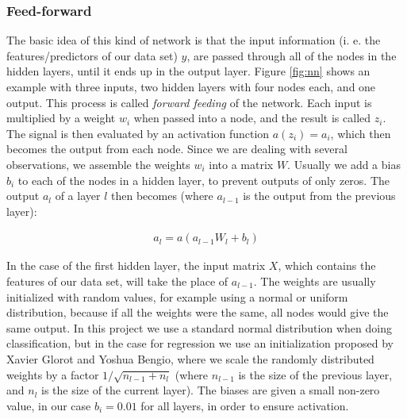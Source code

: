 \subsubsection{Feed-forward}\label{feed-forward}

The basic idea of this kind of network is that the input information (i.
e. the features/predictors of our data set) \(y\), are passed through
all of the nodes in the hidden layers, until it ends up in the output
layer. Figure \ref{fig:nn} shows an example with three inputs, two hidden
layers with four nodes each, and one output. This process is called
\emph{forward feeding} of the network. Each input is multiplied by a
weight \(w_i\) when passed into a node, and the result is called
\(z_i\). The signal is then evaluated by an activation function
\(a(z_i) = a_i\), which then becomes the output from each node. Since
we are dealing with several observations, we assemble the weights
\(w_i\) into a matrix \(W\). Usually we add a bias \(b_i\) to each of the
nodes in a hidden layer, to prevent outputs of only zeros. The output
\(a_l\) of a layer \(l\) then becomes (where \(a_{l-1}\) is the output
from the previous layer):

\begin{align}
a_l = a(a_{l-1} W_l + b_l)
\label{eq:feedforward}
\end{align}

In the case of the first hidden layer, the input matrix \(X\), which contains the features of our data set, will take
the place of \(a_{l-1}\). The weights are usually initialized with
random values, for example using a normal or uniform distribution,
because if all the weights were the same, all nodes would give the
same output. In this project we use a standard normal distribution when
doing classification, but in the case for regression we use an
initialization proposed by Xavier Glorot and Yoshua
Bengio\cite{glorot}, where we scale the randomly
distributed weights by a factor \(1/\sqrt{n_{l-1} + n_l}\) (where \(n_{l-1}\) is
the size of the previous layer, and \(n_l\) is the size of the current
layer). The biases are given a small non-zero value, in our case
\(b_i = 0.01\) for all layers, in order to ensure activation.

